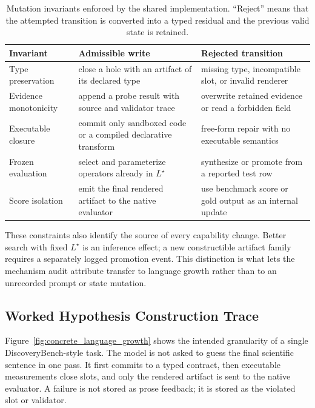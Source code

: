 \documentclass[letterpaper]{article}
\newcommand{\tblhdr}{\rowcolor{headerrow}}
\begin{document}
\begin{table}[!htbp]
\centering
\small
\begin{tabularx}{0.96\textwidth}{|l|Y|Y|}
\hline
\tblhdr
Invariant & Admissible write & Rejected transition \\
\hline
Type preservation & close a hole with an artifact of its declared type & missing type, incompatible slot, or invalid renderer \\
\hline
Evidence monotonicity & append a probe result with source and validator trace & overwrite retained evidence or read a forbidden field \\
\hline
Executable closure & commit only sandboxed code or a compiled declarative transform & free-form repair with no executable semantics \\
\hline
Frozen evaluation & select and parameterize operators already in $L^\star$ & synthesize or promote from a reported test row \\
\hline
Score isolation & emit the final rendered artifact to the native evaluator & use benchmark score or gold output as an internal update \\
\hline
\end{tabularx}
\caption{Mutation invariants enforced by the shared implementation. ``Reject''
means that the attempted transition is converted into a typed residual and the
previous valid state is retained.}
\label{tab:state_mutation_invariants}
\end{table}

These constraints also identify the source of every capability change. Better
search with fixed $L^\star$ is an inference effect; a new constructible
artifact family requires a separately logged promotion event. This distinction
is what lets the mechanism audit attribute transfer to language growth rather
than to an unrecorded prompt or state mutation.

\subsection*{Worked Hypothesis Construction Trace}

Figure~\ref{fig:concrete_language_growth} shows the intended granularity of a single
DiscoveryBench-style task. The model is not asked to guess the final scientific
sentence in one pass. It first commits to a typed contract, then executable
measurements close slots, and only the rendered artifact is sent to the native
evaluator. A failure is not stored as prose feedback; it is stored as the
violated slot or validator.
\end{document}
